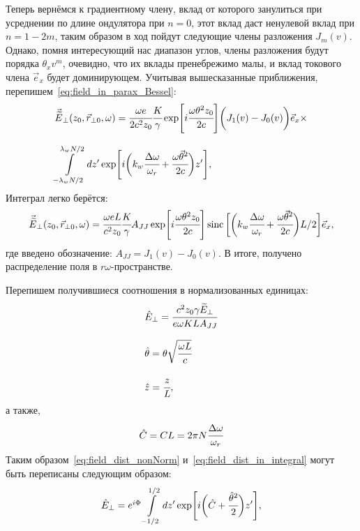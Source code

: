 Теперь вернёмся к градиентному члену, вклад от которого занулиться при усреднении по длине ондулятора при $n = 0$, этот вклад даст ненулевой вклад при $n = 1 - 2m$, таким образом в ход пойдут следующие члены разложения $J_m(v)$. Однако, помня интересующий нас диапазон углов, члены разложения будут порядка $\theta_x v^m$, очевидно, что их вклады пренебрежимо малы, и вклад токового члена $\vec{e}_x$ будет доминирующем. Учитывая вышесказанные приближения, перепишем~\ref{eq:field_in_parax_Bessel}:
\begin{equation}
	\label{eq:field_dist_in_integral}
	\begin{array}{lcl}
		\vec{\widetilde{E}}_{\bot}(z_0,  \vec{r}_{\bot 0}, \omega) =
		\cfrac{\omega e}{2c^2z_0}\cfrac{K}{\gamma}\exp[i\cfrac{\omega \theta^2 z_0}{2c}]
		\bigg(J_1(v) - J_0(v)\bigg)\vec{e}_x\times\\
		\\
		\displaystyle\int\limits_{-\lambda_w N/2}^{\lambda_w N/2} dz'
		\exp[i\bigg(k_w \cfrac{\Delta\omega}{\omega_r} + 
		\cfrac{\omega\vec{\theta}^2}{2c}\bigg)z'],
	\end{array}	
\end{equation}
Интеграл легко берётся:
\begin{equation}
	\label{eq:field_dist_nonNorm}
	\begin{array}{lcl}
		\vec{\widetilde{E}}_{\bot}(z_0,  \vec{r}_{\bot 0}, \omega) =
		\cfrac{\omega eL}{c^2z_0}\cfrac{K}{\gamma}A_{JJ}\exp[i\cfrac{\omega \theta^2 z_0}{2c}]
		\operatorname{sinc} \bigg[\bigg(k_w \cfrac{\Delta\omega}{\omega_r} + 
		\cfrac{\omega\vec{\theta}^2}{2c}\bigg)L/2 \bigg ]\vec{e}_x ,
	\end{array}	
\end{equation}
где введено обозначение: $A_{JJ} = J_1(v) - J_0(v)$. В итоге, получено распределение поля в $r\omega$-пространстве. 

Перепишем получившиеся соотношения в нормализованных единицах:
\begin{equation}
	\label{eq:norm_units}
	\begin{array}{lcl}
		\hat{E}_{\bot} = \cfrac{c^2z_0\gamma \widetilde{E}_{\bot}}{e\omega KLA_{JJ}}\\
		\\
		\hat{\theta} = \theta\sqrt{\cfrac{\omega L}{c}}\\
		\\
		\hat{z} = \cfrac{z}{L} ,
	\end{array}	
\end{equation}
а также, 
\begin{equation}
	\hat{C} = CL = 2\pi N\cfrac{\Delta\omega}{\omega_r}
\end{equation}
Таким образом~\ref{eq:field_dist_nonNorm} и~\ref{eq:field_dist_in_integral} могут быть переписаны следующим образом:
\begin{equation}
	\label{eq:field_dist_in_integral}
	\begin{array}{lcl}
		\hat{E}_{\bot} = e^{i\Phi}
		\displaystyle\int\limits_{-1/2}^{1/2} dz'
		\exp[i\bigg(\hat{C} + 
		\cfrac{\hat{\theta}^2}{2}\bigg)z'],
	\end{array}	
\end{equation}

